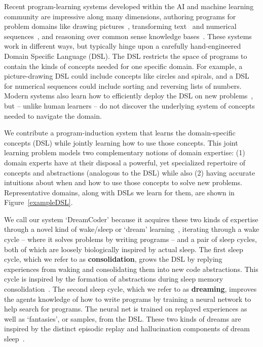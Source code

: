 \documentclass{article}
\begin{document}
Recent program-learning systems developed within the AI and machine
learning community are impressive along many dimensions, authoring
programs for problem domains like drawing
pictures~\cite{spiral,ellis2017learning}, transforming
text~\cite{gulwani2011automating} and numerical
sequences~\cite{balog2016deepcoder}, and reasoning over common sense
knowledge bases~\cite{muggleton2015meta}.  These systems work in
different ways, but typically hinge upon a carefully hand-engineered
Domain Specific Language (DSL).  The DSL restricts the space of
programs to contain the kinds of concepts needed for one specific
domain.  For example, a picture-drawing DSL could include concepts
like circles and spirals, and a DSL for numerical sequences could
include sorting and reversing lists of numbers.  Modern systems also
learn how to efficiently deploy the DSL on new
problems~\cite{devlin2017robustfill,balog2016deepcoder,NGDS}, but --
unlike human learners -- do not discover the underlying system of
concepts needed to navigate the domain.

We contribute a program-induction system that learns the
domain-specific concepts (DSL) while jointly learning how to use those
concepts.  This joint learning problem models two complementary
notions of domain expertise: (1) domain experts have at their disposal
a powerful, yet specialized repertoire of concepts and abstractions
(analogous to the DSL) while also (2) having accurate intuitions about
when and how to use those concepts to solve new problems.
Representative domains,
along with DSLs we learn for them,
are shown in Figure~\ref{exampleDSL}.

We call our system `DreamCoder' because it acquires these two kinds of
expertise through a novel kind of wake/sleep or `dream'
learning~\cite{hinton1995wake}, iterating through a wake cycle --
where it solves problems by writing programs -- and a pair of sleep
cycles, both of which are loosely biologically inspired by actual
sleep.  The first sleep cycle, which we refer to as
\textbf{consolidation}, grows the DSL by replying experiences from
waking and consolidating them into new code abstractions.  This cycle
is inspired by the formation of abstractions during sleep memory
consolidation~\cite{DUDAI201520}.  The second sleep cycle, which we
refer to as \textbf{dreaming}, improves the agents knowledge of how to
write programs by training a neural network to help search for
programs. The neural net is trained on replayed experiences as well as
`fantasies', or samples, from the DSL.  These two kinds of dreams are
inspired by the distinct episodic replay and hallucination components
of dream sleep~\cite{fosse2003dreaming}.
\end{document}
